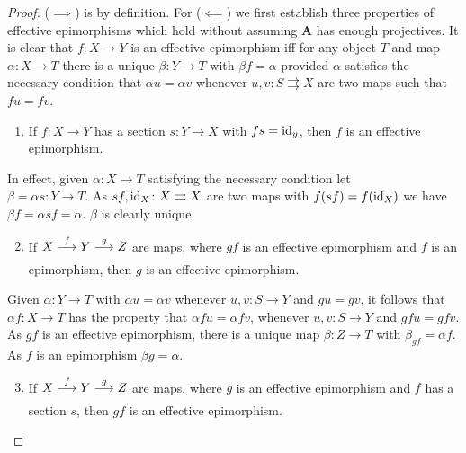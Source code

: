 \documentclass[../main]{subfiles}
\begin{document}
\begin{proof}
($\implies$) is by definition. For ($\impliedby$) we first establish three properties of effective epimorphisms which hold without assuming $\mathbf{A}$ has enough projectives. It is clear that $f \colon X \longrightarrow Y$ is an effective epimorphism iff for any object $T$ and map $\alpha \colon X \longrightarrow T$ there is a unique $\beta \colon Y \longrightarrow T$ with $\beta f = \alpha$ provided $\alpha$ satisfies the necessary condition that $\alpha u = \alpha v$ whenever $u, v \colon S \rightrightarrows X$ are two maps such that $fu = fv$. 

\begin{enumerate}[label = (\arabic*)]
    \item  If $f \colon X \longrightarrow Y$ has a section $s \colon Y \longrightarrow X$ with $fs = \operatorname{id}_y$, then $f$ is an effective epimorphism. 
\end{enumerate}

In effect, given $\alpha \colon X \longrightarrow T$ satisfying the necessary condition let \\$\beta = \alpha s \colon Y \longrightarrow T$. As $sf, \operatorname{id}_X \colon X \rightrightarrows X$ are two maps with $f(sf) = f(\operatorname{id}_X)$ we have $\beta f = \alpha {sf} = \alpha$. $\beta$ is clearly unique. 

\begin{enumerate}[label = (\arabic*)]
\setcounter{enumi}{1}
    \item  If $X \varrightarrow f Y \varrightarrow g Z$ are maps, where $gf$ is an effective epimorphism and $f$ is an epimorphism, then $g$ is an effective epimorphism.
\end{enumerate}

Given $\alpha \colon Y \longrightarrow T$ with $\alpha u = \alpha v$ whenever $u,v \colon S \longrightarrow Y$ and $gu = gv$, it follows that $\alpha f \colon X \longrightarrow T$ has the property that $\alpha {fu} = \alpha {fv}$, whenever $u,v \colon S \longrightarrow Y$ and $gfu = gfv$. As $gf$ is an effective epimorphism, there is a unique map $\beta \colon Z \longrightarrow T$ with $\beta_{gf} = \alpha {f}$. As $f$ is an epimorphism $\beta g = \alpha$.

\begin{enumerate}[label = (\arabic*)]
\setcounter{enumi}{2}
    \item  If $X \varrightarrow f Y \varrightarrow g Z$ are maps, where $g$ is an effective epimorphism and $f$ has a section $s$, then $gf$ is an effective epimorphism.
\end{enumerate}


\end{proof}
\end{document}
